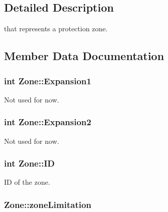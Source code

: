 \subsection{Detailed Description}
that represents a protection zone. 

\subsection{Member Data Documentation}
\subsubsection[{\texorpdfstring{Expansion1}{Expansion1}}]{\setlength{\rightskip}{0pt plus 5cm}int Zone\+::\+Expansion1}\hypertarget{struct_zone_a8610fae6322b4d087aa0651eea3e4154}{}\label{struct_zone_a8610fae6322b4d087aa0651eea3e4154}


Not used for now. 

\subsubsection[{\texorpdfstring{Expansion2}{Expansion2}}]{\setlength{\rightskip}{0pt plus 5cm}int Zone\+::\+Expansion2}\hypertarget{struct_zone_a762759f8b82fbbfb1dbe3a1d278558f0}{}\label{struct_zone_a762759f8b82fbbfb1dbe3a1d278558f0}


Not used for now. 

\subsubsection[{\texorpdfstring{ID}{ID}}]{\setlength{\rightskip}{0pt plus 5cm}int Zone\+::\+ID}\hypertarget{struct_zone_ac2ca5be0d2934da5fc05d06c67caf8f0}{}\label{struct_zone_ac2ca5be0d2934da5fc05d06c67caf8f0}


ID of the zone. 

\subsubsection[{\texorpdfstring{zone\+Limitation}{zoneLimitation}}]{ Zone\+::zone\+Limitation}\hypertarget{struct_zone_ad5be3a05006633e4e2a7b2fdfdead52c}{}\label{struct_zone_ad5be3a05006633e4e2a7b2fdfdead52c}


